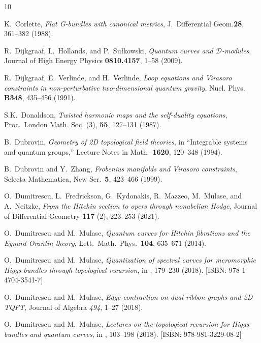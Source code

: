 \documentclass{amsart}
\theoremstyle{definition}
\numberwithin{equation}{section}
\numberwithin{figure}{section}
\newcommand{\cD}{{\mathcal{D}}}
\begin{document}
\begin{thebibliography}{10}
 
 K.~Corlette, 
 \emph{Flat G-bundles with canonical metrics}, 
 J.\ Differential Geom.\textbf{28}, 361--382 (1988).






R.~Dijkgraaf, L.~Hollands, and P.~Su\l kowski,
\emph{Quantum curves and $\cD$-modules},
Journal of High Energy Physics 
\textbf{0810.4157}, 1--58 (2009).





R.~Dijkgraaf, E.~Verlinde, and H.~Verlinde,
\emph{Loop equations and {V}irasoro constraints in non-perturbative two-dimensional quantum gravity}, Nucl. Phys.
\textbf{B348}, 435--456 (1991).


     
 S.K.~Donaldson,
 \emph{Twisted harmonic maps and the self-duality equations},
  Proc.\ London Math. Soc. (3), 
  \textbf{55}, 127--131 (1987).



B.~Dubrovin, 
\emph{Geometry of 2D topological field theories}, 
in ``Integrable systems and quantum groups,'' 
Lecture Notes in Math.\ \textbf{1620}, 120--348 (1994). 

B.~Dubrovin and Y.~Zhang,
\emph{Frobenius manifolds and Virasoro constraints},
Selecta Mathematica, New Ser.\  \textbf{5}, 423--466 (1999).




  
O.~Dumitrescu, L.~Fredrickson, G.~Kydonakis, 
R.~Mazzeo, M.~Mulase, and A.~Neitzke,
\emph{From the Hitchin section to opers through nonabelian Hodge},
Journal of Differential Geometry \textbf{117} (2), 223--253 (2021). 


O.~Dumitrescu and M.~Mulase,
\emph{Quantum curves for Hitchin fibrations
and the Eynard-Orantin theory},
Lett.\ Math.\ Phys.\ \textbf{104}, 635--671 (2014).

O.~Dumitrescu and M.~Mulase,
\emph{Quantization of spectral  curves for 
meromorphic Higgs bundles through
topological recursion},
 in 
 \cite{LM}, 179--230
 (2018). [ISBN: 978-1-4704-3541-7]

 
O.~Dumitrescu and M.~Mulase,
\emph{Edge contraction on dual ribbon graphs and 2D TQFT}, 
Journal of Algebra \emph{494}, 1--27 (2018).


O.~Dumitrescu and M.~Mulase,
\emph{Lectures on the topological recursion for Higgs 
bundles and quantum curves}, 
in \cite{WW}, 103--198 (2018).
[ISBN: 978-981-3229-08-2]


\end{thebibliography}
\end{document}
